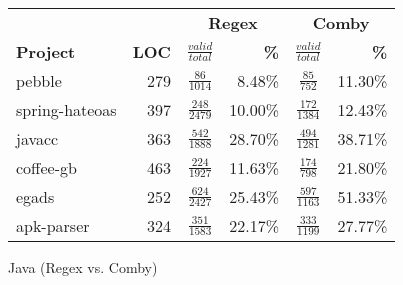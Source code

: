 \documentclass[sigconf,review, anonymous]{acmart}
\begin{document}
{\begin{table}[hbtp]
\begin{tabular}{l|r|cr|cr}
\toprule
                 &              & \multicolumn{2}{c|}{\textbf{Regex}} &\multicolumn{2}{c}{\textbf{Comby}}  \\
\textbf{Project} & \textbf{LOC} & $\frac{valid}{total}$ & \textbf{\%} & $\frac{valid}{total}$ &  \textbf{\%} \\[1ex]\midrule
pebble         & 279 & $\frac{86}{1014}$ & 8.48\% & $\frac{85}{752}$ & 11.30\%  \\[1ex]
spring-hateoas & 397 & $\frac{248}{2479}$ & 10.00\% & $\frac{172}{1384}$ & 12.43\%  \\[1ex]
javacc         & 363 & $\frac{542}{1888}$ & 28.70\% & $\frac{494}{1281}$ & 38.71\%  \\[1ex]
coffee-gb      & 463 & $\frac{224}{1927}$ & 11.63\% & $\frac{174}{798}$ & 21.80\% \\[1ex]
egads          & 252 & $\frac{624}{2427}$ & 25.43\% & $\frac{597}{1163}$ & 51.33\%  \\[1ex]
apk-parser     & 324 & $\frac{351}{1583}$ & 22.17\% & $\frac{333}{1199}$ & 27.77\%  \\[1ex]




\end{tabular}

\end{table}

  

\begin{table}[hbtp]
\centering
\caption{Java (Regex vs. Comby)}
\label{tab:table_java1}
\resizebox{\columnwidth}{!}{%

}
\end{table}}
\end{document}

